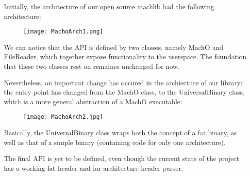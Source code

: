 
Initially, the architecture of our open source machlib had the following
architecture:

\begin{figure}[H]
  \texttt{[image: MachoArch1.png]}
  \centering
\end{figure}

We can notice that the API is defined by two classes, namely MachO and
FileReader, which together expose functionality to the userspace. The
foundation that these two classes rest on remaines unchanged for now.

Nevertheless, an important change has occured in the archiecture of our
library: the entry point has changed from the MachO class, to the
UniversalBinary class, which is a more general abstraction of a MachO
executable:

\begin{figure}[H]
  \texttt{[image: MachoArch2.jpg]}
  \centering
\end{figure}

Basically, the UniversalBinary class wraps both the concept of a fat binary,
as well as that of a simple binary (containing code for only one
architecture).

The final API is yet to be defined, even though the current state of the
project has a working fat header and far architecture header parser.
